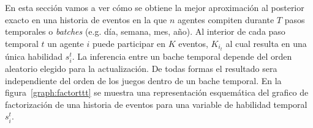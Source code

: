 \documentclass[11pt,twoside,spanish]{report} %
\begin{document}
En esta secci\'on vamos a ver c\'omo se obtiene la mejor aproximaci\'on al posterior exacto en una historia de eventos en la que $n$ agentes compiten durante $T$ pasos temporales o \emph{batches} (e.g. d\'ia, semana, mes, año).
Al interior de cada paso temporal $t$ un agente $i$ puede participar en $K$ eventos, $K_{i_t}$ al cual resulta en una \'unica habilidad $s_i^t$.
La inferencia entre un bache temporal depende del orden aleatorio elegido para la actualizaci\'on. 
De todas formas el resultado sera independiente del orden de los juegos dentro de un bache temporal.
En la figura~\ref{graph:factorttt} se muestra una representaci\'on esquemática del grafico de factorizaci\'on de una historia de eventos para una variable de habilidad temporal $s_i^t$.




\begin{figure}[H]
\centering
\end{figure}
\end{document}
